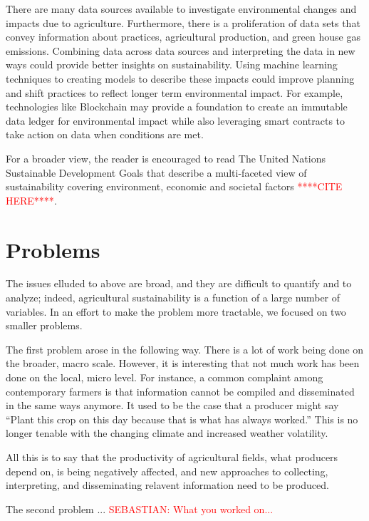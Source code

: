 \documentclass[11pt]{article}
\numberwithin{equation}{section}
\numberwithin{figure}{section}
\newcommand{\rred}[1]{\textcolor{red}{#1}}
\newcommand{\ccite}{\rred{****CITE HERE****}}
\begin{document}
There are many data sources available to investigate environmental changes and impacts due to agriculture. Furthermore, there is a proliferation of data sets that convey information about practices, agricultural production, and green house gas emissions. Combining data across data sources and interpreting the data in new ways could provide better insights on sustainability. Using machine learning techniques to creating models to describe these impacts could improve planning and shift practices to reflect longer term environmental impact. For example, technologies like Blockchain may provide a foundation to create an immutable data ledger for environmental impact while also leveraging smart contracts to take action on data when conditions are met.

For a broader view, the reader is encouraged to read The United Nations Sustainable Development Goals that describe a multi-faceted view of sustainability covering environment, economic and societal factors \ccite.


\section{Problems}\label{problems}

The issues elluded to above are broad, and they are difficult to quantify and to analyze; indeed, agricultural sustainability is a function of a large number of variables. In an effort to make the problem more tractable, we focused on two smaller problems.

The first problem arose in the following way. There is a lot of work being done on the broader, macro scale. However, it is interesting that not much work has been done on the local, micro level. For instance, a common complaint among contemporary farmers is that information cannot be compiled and disseminated in the same ways anymore. It used to be the case that a producer might say ``Plant this crop on this day because that is what has always worked.'' This is no longer tenable with the changing climate and increased weather volatility.

All this is to say that the productivity of agricultural fields, what producers depend on, is being negatively affected, and new approaches to collecting, interpreting, and disseminating relavent information need to be produced.

The second problem ... \rred{SEBASTIAN: What you worked on...}
\end{document}
